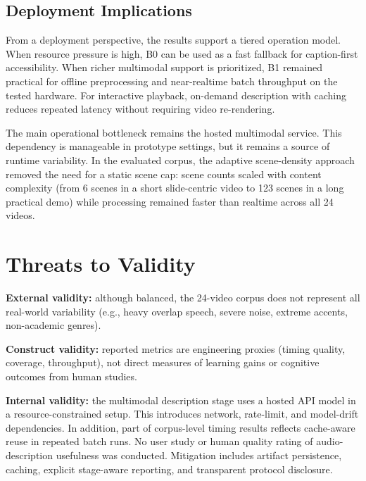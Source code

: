 \documentclass[conference]{IEEEtran}
\begin{document}
\subsection{Deployment Implications}
From a deployment perspective, the results support a tiered operation model. When resource pressure is high, B0 can be used as a fast fallback for caption-first accessibility. When richer multimodal support is prioritized, B1 remained practical for offline preprocessing and near-realtime batch throughput on the tested hardware. For interactive playback, on-demand description with caching reduces repeated latency without requiring video re-rendering.

The main operational bottleneck remains the hosted multimodal service. This dependency is manageable in prototype settings, but it remains a source of runtime variability. In the evaluated corpus, the adaptive scene-density approach removed the need for a static scene cap: scene counts scaled with content complexity (from 6 scenes in a short slide-centric video to 123 scenes in a long practical demo) while processing remained faster than realtime across all 24 videos.

\section{Threats to Validity}
\textbf{External validity:} although balanced, the 24-video corpus does not represent all real-world variability (e.g., heavy overlap speech, severe noise, extreme accents, non-academic genres).

\textbf{Construct validity:} reported metrics are engineering proxies (timing quality, coverage, throughput), not direct measures of learning gains or cognitive outcomes from human studies.

\textbf{Internal validity:} the multimodal description stage uses a hosted API model in a resource-constrained setup. This introduces network, rate-limit, and model-drift dependencies. In addition, part of corpus-level timing results reflects cache-aware reuse in repeated batch runs. No user study or human quality rating of audio-description usefulness was conducted. Mitigation includes artifact persistence, caching, explicit stage-aware reporting, and transparent protocol disclosure.
\end{document}
